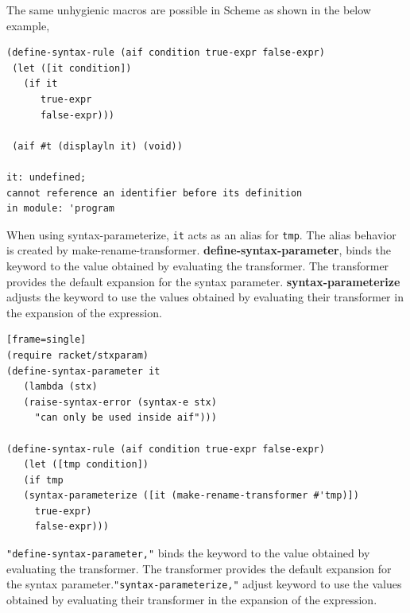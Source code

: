 The same unhygienic macros are possible in Scheme as shown in the below example, 
\begin{lstlisting}[frame=single]
(define-syntax-rule (aif condition true-expr false-expr)
 (let ([it condition])
   (if it
      true-expr
      false-expr)))

 (aif #t (displayln it) (void))

it: undefined;
cannot reference an identifier before its definition
in module: 'program
\end{lstlisting}

When using syntax-parameterize, \texttt{it} acts as an alias for \texttt{tmp}. The alias behavior is created by make-rename-transformer. \textbf{define-syntax-parameter}, binds the keyword to the value obtained by evaluating the transformer. The transformer provides the default expansion for the syntax parameter. \textbf{syntax-parameterize} adjusts the keyword to use the values obtained by evaluating their transformer in the expansion of the expression. 

\begin{lstlisting}[frame=single][frame=single]
(require racket/stxparam)
(define-syntax-parameter it
   (lambda (stx)
   (raise-syntax-error (syntax-e stx)
     "can only be used inside aif")))

(define-syntax-rule (aif condition true-expr false-expr)
   (let ([tmp condition])
   (if tmp
   (syntax-parameterize ([it (make-rename-transformer #'tmp)])
     true-expr)
     false-expr)))
\end{lstlisting}
\texttt{"define-syntax-parameter,"} binds the keyword to the value obtained by evaluating the transformer. The transformer provides the default expansion for the syntax parameter.\texttt{"syntax-parameterize,"} adjust keyword to use the values obtained by evaluating their transformer in the expansion of the expression. 
